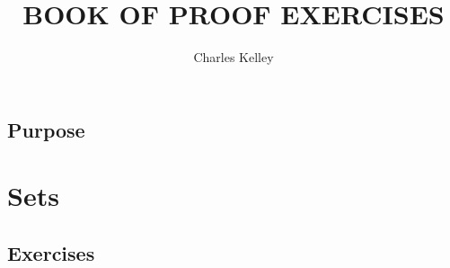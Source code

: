 \documentclass[12pt]{report}
\title{BOOK OF PROOF EXERCISES}
\author{Charles Kelley}
\date{ }
\begin{document}
\maketitle

\tableofcontents{}
\clearpage

\section*{Purpose}

\clearpage

\chapter{Sets}
\section{Exercises}

\end{document}
